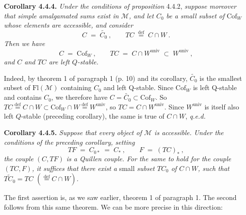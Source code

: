 \documentclass[11pt]{article}
\newcommand{\msp}[1]{\marginpar{\footnotesize [#1]}}
\newcommand{\Fl}{\mathrm{Fl}}
\newcommand{\Cof}{\mathrm{Cof}}
\newcommand{\deq}{\overset{\text{def}}{=}}
\newcommand{\univ}{\mathrm{univ}}
\begin{document}
\textbf{Corollary 4.4.4.} \textit{Under the conditions of proposition} 4.4.2, \textit{suppose moreover that simple amalgamated sums exist in $\mathcal{M}$, and let $C_0$ be a small subset of} $\Cof_W$ \textit{whose elements are accessible, and consider}
\[
C\;=\;\widetilde{C_0}\ ,\qquad TC\;\deq\;C\cap W\ .
\]
\textit{Then we have}
\[
C\;=\;\Cof_W\ ,\qquad TC\;=\;C\cap W^{\univ}\;\subset\;W^{\univ}\ ,
\]
\msp{page 41}
\textit{and $C$ and $TC$ are left $Q$-stable.}

Indeed, by theorem 1 of paragraph 1 (p. 10) and its corollary, $\widetilde{C_0}$ is the smallest subset of $\Fl(\mathcal{M})$ containing $C_0$ and left Q-stable. Since $\Cof_W$ is left Q-stable and contains $C_0$, we therefore have $C=\widetilde{C_0}\subset\Cof_W$. So $TC\deq C{\cap}W\subset\Cof_W{\cap}W\deq W^{\univ}$, so $TC=C\cap W^{\univ}$. Since $W^{\univ}$ is itself also left $Q$-stable (preceding corollary), the same is true of $C\cap W$, \quad \textit{q.e.d.}

\textbf{Corollary 4.4.5.} \textit{Suppose that every object of $\mathcal{M}$ is accessible. Under the conditions of the preceding corollary, setting}
\[
TF\;=\;C_{0*}\;=\;C_*\ ,\qquad F\;=\;(TC)_*\ ,
\]
\textit{the couple $(C,TF)$ is a Quillen couple. For the same to hold for the couple $(TC,F)$, it suffices that there exist a} small \textit{subset $TC_0$ of $C\cap W$, such that $\widetilde{TC_0}=TC$ $(\deq C\cap W)$.}

The first assertion is, as we saw earlier, theorem 1 of paragraph 1. The second follows from this same theorem. We can be more precise in this direction:
\end{document}
